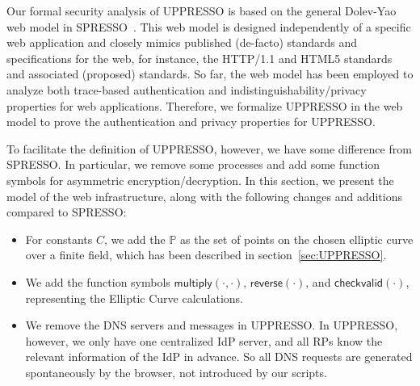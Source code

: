Our formal security analysis of UPPRESSO is based on 
the general Dolev-Yao web model in SPRESSO~\cite{SPRESSO}. 
This web model is designed independently of a specific web application and closely mimics published (de-facto) standards and specifications for the web, for instance, the HTTP/1.1 and HTML5 standards and associated (proposed) standards. 
So far, the web model has been employed to analyze both trace-based authentication and indistinguishability/privacy properties for web applications.
Therefore, we formalize UPPRESSO in the web model to prove the authentication and privacy properties for UPPRESSO.

To facilitate the definition of UPPRESSO, however, 
we have some difference from SPRESSO. 
In particular, we remove some processes and 
add some function symbols for asymmetric encryption/decryption.
In this section, we present the model of the web infrastructure, along with the following changes and additions compared to SPRESSO:
\begin{itemize}
\item For constants $C$, we add the $\mathbb{P}$ as the set of points on the chosen elliptic curve over a finite field, which has been described in section~\ref{sec:UPPRESSO}.
\item We add the function symbols $\mathsf{multiply}(\cdot, \cdot)$, $\mathsf{reverse}(\cdot)$, and $\mathsf{checkvalid}(\cdot)$, representing the Elliptic Curve calculations.
\item We remove the DNS servers and messages in UPPRESSO. In UPPRESSO, however, we only have one centralized IdP server, and 
all RPs know the relevant information of the IdP in advance.
So all DNS requests are generated spontaneously by the browser, 
not introduced by our scripts.
\end{itemize}






